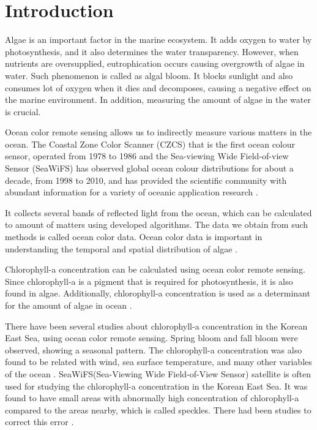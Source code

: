 \section{Introduction}

Algae is an important factor in the marine ecosystem. It adds oxygen to water by photosynthesis, and it also determines the water transparency. However, when nutrients are oversupplied, eutrophication occurs causing overgrowth of algae in water. Such phenomenon is called as algal bloom. It blocks sunlight and also consumes lot of oxygen when it dies and decomposes, causing a negative effect on the marine environment. In addition, measuring the amount of algae in the water is crucial.

Ocean color remote sensing allows us to indirectly measure various matters in the ocean. The Coastal Zone Color Scanner (CZCS) that is the first ocean colour sensor, operated from 1978 to 1986 and the Sea-viewing Wide Field-of-view Sensor (SeaWiFS) has observed global ocean colour distributions for about a decade, from 1998 to 2010, and has provided the scientific community with abundant information for a variety of oceanic application research \cite{kyung2013characteristics, hooker1992An}.

It collects several bands of reflected light from the ocean, which can be calculated to amount of matters using developed algorithms. The data we obtain from such methods is called ocean color data. Ocean color data is important in understanding the temporal and spatial distribution of algae \cite{Kimhc}.

Chlorophyll-a concentration can be calculated using ocean color remote sensing. Since chlorophyll-a is a pigment that is required for photosynthesis, it is also found in algae. Additionally, chlorophyll-a concentration is used as a determinant for the amount of algae in ocean \cite{o2000ocean}. 

There have been several studies about chlorophyll-a concentration in the Korean East Sea, using ocean color remote sensing. Spring bloom and fall bloom were observed, showing a seasonal pattern. The chlorophyll-a concentration was also found to be related with wind, sea surface temperature, and many other variables of the ocean \cite{yamada2004seasonal}. SeaWiFS(Sea-Viewing Wide Field-of-View Sensor) satellite is often used for studying the chlorophyll-a concentration in the Korean East Sea. It was found to have small areas with abnormally high concentration of chlorophyll-a compared to the areas nearby, which is called speckles. There had been studies to correct this error \cite{chae2009characteristics}. 

